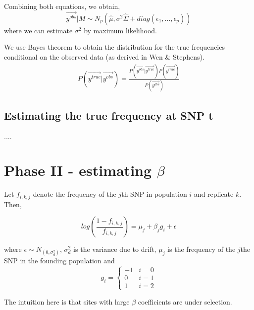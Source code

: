 \documentclass[10pt,a4paper,draft]{article}
\begin{document}
Combining both equations, we obtain,
\begin{equation}
 \vec{y^{obs}}|M \sim N_p(\hat{\mu}, \sigma^2\hat{\Sigma} + diag(\epsilon_1,...,\epsilon_p))
\end{equation}
where we can estimate $\sigma^2$ by maximum likelihood.

We use Bayes theorem to obtain the distribution for the true frequencies conditional on the observed data (as derived in Wen \& Stephens).
\begin{align*}
P(\vec{y^{true}} | \vec{y^{obs}}) = \frac{P(\vec{y^{obs}} | \vec{y^{true}}) P(\vec{y^{true}})}{P(\vec{y^{obs}})} 
\end{align*}

\iffalse
\begin{equation}
\sim N_p\Big((\frac{\hat{\Sigma}^{-1}}{\sigma^2} + \frac{I}{\epsilon^2})^{-1}(\frac{\hat{\Sigma}^{-1}\hat{\mu}}{\sigma^2} + \frac{\vec{y^{obs}}}{\epsilon^2}), (\frac{\hat{\Sigma}^{-1}}{\sigma^2} + \frac{I}{\epsilon^2})^{-1}\Big)\label{likl}
\end{equation}
\fi
\subsection{Estimating the true frequency at SNP t}
....

\section{Phase II - estimating $\beta$}
Let $f_{i,k,j}$ denote the frequency of the $j$th SNP in population $i$ and replicate $k$. Then,

\begin{equation}
log(\frac{1-f_{i,k,j}}{f_{i,k,j}}) = \mu_j + \beta_j g_i + \epsilon
\end{equation}

where $\epsilon \sim N_(0, \sigma_d^2)$, $\sigma_d^2$ is the variance due to drift, $\mu_j$ is the frequency of the $j$the SNP in the founding population and 
\[
   g_{i} = \left\{
     \begin{array}{lr}
       -1 &  i =0\\
        0 &  i =1 \\
        1 &  i =2
     \end{array}
   \right.
\]

The intuition here is that sites with large $\beta$ coefficients are under selection.
\end{document}
